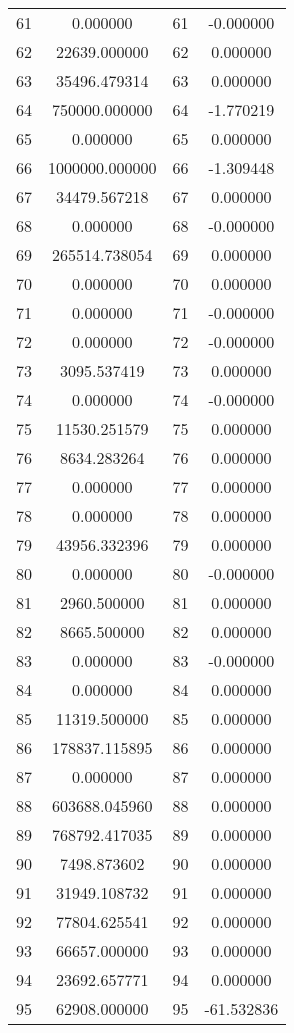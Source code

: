 \documentclass[12pt]{article}
\begin{document}
\begin{longtable}{@{}cccc@{}}
61 & 0.000000 & 61 & -0.000000 \\
62 & 22639.000000 & 62 & 0.000000 \\
63 & 35496.479314 & 63 & 0.000000 \\
64 & 750000.000000 & 64 & -1.770219 \\
65 & 0.000000 & 65 & 0.000000 \\
66 & 1000000.000000 & 66 & -1.309448 \\
67 & 34479.567218 & 67 & 0.000000 \\
68 & 0.000000 & 68 & -0.000000 \\
69 & 265514.738054 & 69 & 0.000000 \\
70 & 0.000000 & 70 & 0.000000 \\
71 & 0.000000 & 71 & -0.000000 \\
72 & 0.000000 & 72 & -0.000000 \\
73 & 3095.537419 & 73 & 0.000000 \\
74 & 0.000000 & 74 & -0.000000 \\
75 & 11530.251579 & 75 & 0.000000 \\
76 & 8634.283264 & 76 & 0.000000 \\
77 & 0.000000 & 77 & 0.000000 \\
78 & 0.000000 & 78 & 0.000000 \\
79 & 43956.332396 & 79 & 0.000000 \\
80 & 0.000000 & 80 & -0.000000 \\
81 & 2960.500000 & 81 & 0.000000 \\
82 & 8665.500000 & 82 & 0.000000 \\
83 & 0.000000 & 83 & -0.000000 \\
84 & 0.000000 & 84 & 0.000000 \\
85 & 11319.500000 & 85 & 0.000000 \\
86 & 178837.115895 & 86 & 0.000000 \\
87 & 0.000000 & 87 & 0.000000 \\
88 & 603688.045960 & 88 & 0.000000 \\
89 & 768792.417035 & 89 & 0.000000 \\
90 & 7498.873602 & 90 & 0.000000 \\
91 & 31949.108732 & 91 & 0.000000 \\
92 & 77804.625541 & 92 & 0.000000 \\
93 & 66657.000000 & 93 & 0.000000 \\
94 & 23692.657771 & 94 & 0.000000 \\
95 & 62908.000000 & 95 & -61.532836 \\

\end{longtable}
\end{document}
